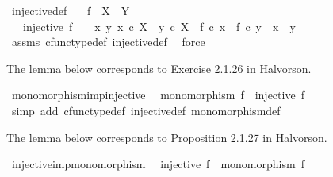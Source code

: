 \begin{isabellebody}
\isanewline
{}\isamarkupfalse%
\ injective{\isacharunderscore}{\kern0pt}def{}{\isacharcolon}{\kern0pt}\isanewline
\ \ \ {\isachardoublequoteopen}f\ {\isacharcolon}{\kern0pt}\ X\ {\isasymrightarrow}\ Y{\isachardoublequoteclose}\isanewline
\ \ \ {\isachardoublequoteopen}injective\ f\ \ {\isasymlongleftrightarrow}\ {\isacharparenleft}{\kern0pt}{\isasymforall}\ x\ y{\isachardot}{\kern0pt}\ {\isacharparenleft}{\kern0pt}x\ {\isasymin}\isactrlsub c\ X\ {\isasymand}\ y\ {\isasymin}\isactrlsub c\ X\ {\isasymand}\ f\ {\isasymcirc}\isactrlsub c\ x\ {\isacharequal}{\kern0pt}\ f\ {\isasymcirc}\isactrlsub c\ y{\isacharparenright}{\kern0pt}\ {\isasymlongrightarrow}\ x\ {\isacharequal}{\kern0pt}\ y{\isacharparenright}{\kern0pt}{\isachardoublequoteclose}\isanewline
%
\isadelimproof
\ \ %
\endisadelimproof
%
\isatagproof
{}\isamarkupfalse%
\ assms\ cfunc{\isacharunderscore}{\kern0pt}type{\isacharunderscore}{\kern0pt}def\ injective{\isacharunderscore}{\kern0pt}def\ \isamarkupfalse%
\ force%
\endisatagproof
{\isafoldproof}%
%
\isadelimproof
%
\endisadelimproof
%
\begin{isamarkuptext}%
The lemma below corresponds to Exercise 2.1.26 in Halvorson.%
\end{isamarkuptext}\isamarkuptrue%
\isamarkupfalse%
\ monomorphism{\isacharunderscore}{\kern0pt}imp{\isacharunderscore}{\kern0pt}injective{\isacharcolon}{\kern0pt}\isanewline
\ \ {\isachardoublequoteopen}monomorphism\ f\ {\isasymLongrightarrow}\ injective\ f{\isachardoublequoteclose}\isanewline
%
\isadelimproof
\ \ %
\endisadelimproof
%
\isatagproof
{}\isamarkupfalse%
\ {\isacharparenleft}{\kern0pt}simp\ add{\isacharcolon}{\kern0pt}\ cfunc{\isacharunderscore}{\kern0pt}type{\isacharunderscore}{\kern0pt}def\ injective{\isacharunderscore}{\kern0pt}def\ monomorphism{\isacharunderscore}{\kern0pt}def{\isacharparenright}{\kern0pt}%
\endisatagproof
{\isafoldproof}%
%
\isadelimproof
%
\endisadelimproof
%
\begin{isamarkuptext}%
The lemma below corresponds to Proposition 2.1.27 in Halvorson.%
\end{isamarkuptext}\isamarkuptrue%
\isamarkupfalse%
\ injective{\isacharunderscore}{\kern0pt}imp{\isacharunderscore}{\kern0pt}monomorphism{\isacharcolon}{\kern0pt}\isanewline
\ \ {\isachardoublequoteopen}injective\ f\ {\isasymLongrightarrow}\ monomorphism\ f{\isachardoublequoteclose}\isanewline
%
\isadelimproof
\ \ %
\endisadelimproof
%
\isatagproof
{}\isamarkupfalse%

\end{isabellebody}
